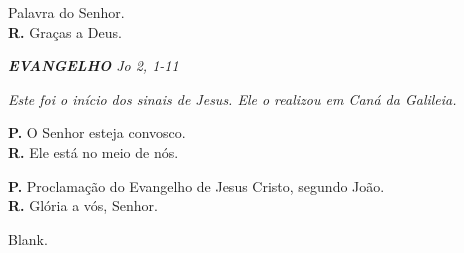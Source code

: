 \documentclass[a5paper,9pt]{memoir}
\begin{document}
{Palavra do Senhor.\\
\textbf{R.} Graças a Deus.


%	

\vspace{0.3cm}
{\itshape \color{mygray}\textbf{EVANGELHO} \hfill 
Jo 2, 1-11}
\vspace{-0.3cm}
\begin{center}
	\itshape \color{mygray} \small
	\guillemotleft Este foi o in\'icio dos sinais de Jesus. Ele o realizou em Can\'a da Galileia.\guillemotright
\end{center}
\vspace{-0.3cm}

\textbf{P.} O Senhor esteja convosco.\\
\textbf{R.} Ele est\'a no meio de n\'os.

\textbf{P.} {\color{mygray}\CrossMaltese}  Proclama\c c\~ao do Evangelho de Jesus Cristo, segundo João.\\
\textbf{R.} Gl\'oria a v\'os, Senhor.

\begin{paracol}{2}
	{\color{white}Blank.}
	
	\switchcolumn
	

\end{paracol}}
\end{document}
